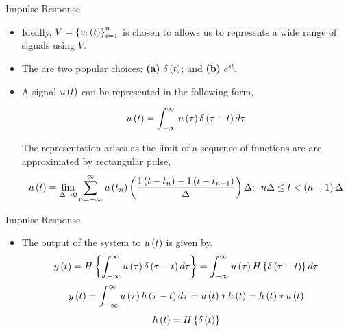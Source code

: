 \documentclass[aspectratio=169]{beamer}
\def\lp{\ensuremath\left(}
\def\rp{\ensuremath\right)}
\def\lc{\ensuremath\left\{}
\def\rc{\ensuremath\right\}}
\begin{document}
\begin{frame}{Impulse Response}
\begin{center}
\end{center}

\begin{itemize}    
    \item Ideally, $V = \lc v_i\lp t\rp \rc_{i=1}^n$ is chosen to allows us to represents a wide range of signals using $V$.
    
    \item The are two popular choices: \textbf{(a)} $\delta\lp t \rp$; and \textbf{(b)} $e^{st}$.

    \item A signal $u\lp t\rp$ can be represented in the following form,

    \[ u\lp t\rp = \int_{-\infty}^{\infty} u\lp \tau \rp \delta\lp \tau - t\rp d\tau \]
    
    The representation arises as the limit of a sequence of functions are are approximated by rectangular pulse,
    \[ u\lp t \rp = \lim_{\Delta \to 0} \sum_{n=-\infty}^{\infty} u\lp t_n \rp \lp \frac{1\lp t - t_n\rp - 1\lp t - t_{n+1}\rp}{\Delta}\rp \Delta; \,\,\, n\Delta \leq t < \lp n+1\rp\Delta  \]   
\end{itemize}
\end{frame}


\begin{frame}{Impulse Response}
\begin{center}
\end{center}
\begin{itemize} 
    \item The output of the system to $u\lp t\rp$ is given by,
    \[ y\lp t\rp = H\lc \int_{-\infty}^{\infty} u\lp \tau \rp \delta\lp \tau - t\rp d\tau \rc = \int_{-\infty}^{\infty} u\lp \tau \rp H\lc \delta\lp \tau - t\rp  \rc d\tau \]
    \[ y\lp t\rp = \int_{-\infty}^{\infty} u\lp \tau \rp h\lp \tau - t\rp d\tau = u\lp t\rp * h\lp t\rp = h\lp t\rp * u\lp t\rp \]
    \[ h\lp t\rp = H\lc \delta\lp t\rp \rc \]
\end{itemize}
\end{frame}
\end{document}

